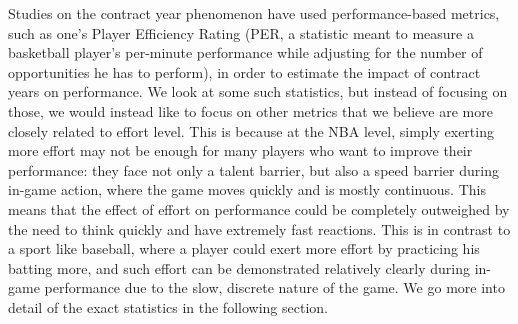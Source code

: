 \documentclass[12pt]{article}
\begin{document}
	Studies on the contract year phenomenon have used performance-based metrics, such as one's Player Efficiency Rating (PER, a statistic meant to measure a basketball player's per-minute performance while adjusting for the number of opportunities he has to perform), in order to estimate the impact of contract years on performance. We look at some such statistics, but instead of focusing on those, we would instead like to focus on other metrics that we believe are more closely related to effort level. This is because at the NBA level, simply exerting more effort may not be enough for many players who want to improve their performance: they face not only a talent barrier, but also a speed barrier during in-game action, where the game moves quickly and is mostly continuous. This means that the effect of effort on performance could be completely outweighed by the need to think quickly and have extremely fast reactions. This is in contrast to a sport like baseball, where a player could exert more effort by practicing his batting more, and such effort can be demonstrated relatively clearly during in-game performance due to the slow, discrete nature of the game. We go more into detail of the exact statistics in the following section.
	
\end{document}
